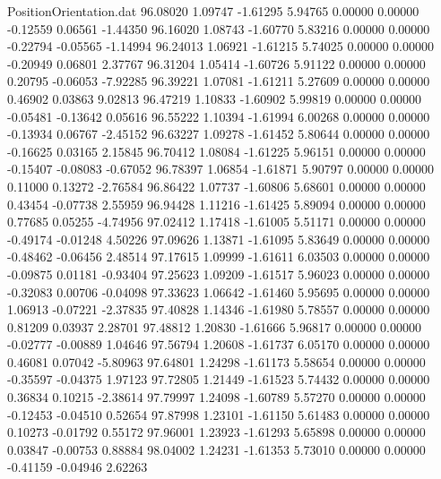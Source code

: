 \begin{filecontents}{PositionOrientation.dat}
  96.08020    1.09747   -1.61295     5.94765    0.00000    0.00000   -0.12559    0.06561   -1.44350
  96.16020    1.08743   -1.60770     5.83216    0.00000    0.00000   -0.22794   -0.05565   -1.14994
  96.24013    1.06921   -1.61215     5.74025    0.00000    0.00000   -0.20949    0.06801    2.37767
  96.31204    1.05414   -1.60726     5.91122    0.00000    0.00000    0.20795   -0.06053   -7.92285
  96.39221    1.07081   -1.61211     5.27609    0.00000    0.00000    0.46902    0.03863    9.02813
  96.47219    1.10833   -1.60902     5.99819    0.00000    0.00000   -0.05481   -0.13642    0.05616
  96.55222    1.10394   -1.61994     6.00268    0.00000    0.00000   -0.13934    0.06767   -2.45152
  96.63227    1.09278   -1.61452     5.80644    0.00000    0.00000   -0.16625    0.03165    2.15845
  96.70412    1.08084   -1.61225     5.96151    0.00000    0.00000   -0.15407   -0.08083   -0.67052
  96.78397    1.06854   -1.61871     5.90797    0.00000    0.00000    0.11000    0.13272   -2.76584
  96.86422    1.07737   -1.60806     5.68601    0.00000    0.00000    0.43454   -0.07738    2.55959
  96.94428    1.11216   -1.61425     5.89094    0.00000    0.00000    0.77685    0.05255   -4.74956
  97.02412    1.17418   -1.61005     5.51171    0.00000    0.00000   -0.49174   -0.01248    4.50226
  97.09626    1.13871   -1.61095     5.83649    0.00000    0.00000   -0.48462   -0.06456    2.48514
  97.17615    1.09999   -1.61611     6.03503    0.00000    0.00000   -0.09875    0.01181   -0.93404
  97.25623    1.09209   -1.61517     5.96023    0.00000    0.00000   -0.32083    0.00706   -0.04098
  97.33623    1.06642   -1.61460     5.95695    0.00000    0.00000    1.06913   -0.07221   -2.37835
  97.40828    1.14346   -1.61980     5.78557    0.00000    0.00000    0.81209    0.03937    2.28701
  97.48812    1.20830   -1.61666     5.96817    0.00000    0.00000   -0.02777   -0.00889    1.04646
  97.56794    1.20608   -1.61737     6.05170    0.00000    0.00000    0.46081    0.07042   -5.80963
  97.64801    1.24298   -1.61173     5.58654    0.00000    0.00000   -0.35597   -0.04375    1.97123
  97.72805    1.21449   -1.61523     5.74432    0.00000    0.00000    0.36834    0.10215   -2.38614
  97.79997    1.24098   -1.60789     5.57270    0.00000    0.00000   -0.12453   -0.04510    0.52654
  97.87998    1.23101   -1.61150     5.61483    0.00000    0.00000    0.10273   -0.01792    0.55172
  97.96001    1.23923   -1.61293     5.65898    0.00000    0.00000    0.03847   -0.00753    0.88884
  98.04002    1.24231   -1.61353     5.73010    0.00000    0.00000   -0.41159   -0.04946    2.62263

\end{filecontents}
